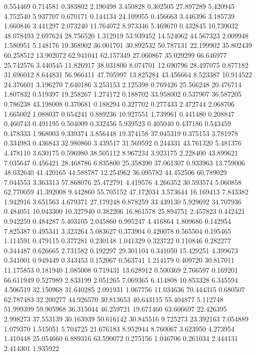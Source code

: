 0.554469
0.714581
0.383802
2.190498
3.450828
0.302505
27.897289
5.420945
4.752540
5.937707
0.670171
0.144134
24.109955
0.456663
3.446396
3.185739
1.660846
3.441297
2.073240
11.764072
8.973346
5.469670
0.432845
10.739032
48.078493
2.697624
28.756520
1.312919
53.939452
14.524062
44.567323
2.009948
1.580951
5.148176
19.368902
36.001701
30.892532
50.787131
22.199902
35.802439
60.258512
13.902072
62.941041
62.157349
27.060867
35.029299
66.646977
25.742576
3.440545
11.826917
38.031800
8.074701
12.690796
28.497075
0.877182
31.696012
8.644831
56.966411
47.705997
13.825284
43.456664
8.523387
10.914522
24.376601
3.196270
7.640186
3.253153
2.125398
0.769426
25.566248
20.476714
1.807832
0.519397
19.258267
1.274172
0.188702
33.958002
0.537907
36.587205
0.786238
43.198008
0.370681
0.188294
0.327702
0.277433
2.472744
2.068706
1.665002
1.088037
0.654241
0.889236
10.927551
1.739961
0.441480
0.208847
0.460743
0.491195
0.504009
0.332456
5.939523
0.405040
0.437186
0.543459
0.478333
1.968003
9.339374
3.856448
19.374158
37.045319
0.375153
3.781978
0.334983
0.436843
32.980860
3.439517
31.569592
0.244331
43.761320
5.481376
4.478110
3.630175
0.596980
38.505112
8.967234
3.923175
2.228400
43.899621
7.035647
0.456421
28.468786
6.835800
25.358390
37.061307
0.933963
13.759006
48.032640
41.420165
44.588787
12.254962
36.095782
44.452506
60.789029
7.044553
3.363313
57.868076
25.472791
4.419576
4.266352
30.593574
5.060858
62.770059
41.392008
9.442860
55.705152
47.172034
3.573644
16.169413
7.843382
1.942916
3.651563
4.679371
27.179248
0.878259
33.439130
5.929692
34.707936
0.484051
10.043300
10.327940
0.382206
16.861578
25.894751
2.457823
0.442421
0.942259
0.484287
5.403105
2.045860
0.995247
4.416864
1.809686
0.142954
7.825387
0.495341
3.323264
5.083627
0.373904
0.420078
0.565504
0.195465
1.114591
0.479115
0.377281
0.230148
1.041329
0.323722
0.110846
0.282277
0.344487
0.626665
2.731582
0.192297
29.301104
0.341050
15.429251
4.399673
0.341001
0.949449
0.343453
0.152067
0.563741
1.214179
0.409720
30.817011
11.175853
0.181940
1.085008
0.719431
13.628912
0.500369
2.766597
0.169201
66.611949
0.527989
2.833199
2.051265
7.069365
6.414808
10.853328
6.345594
4.506519
32.150968
31.640285
2.091931
1.067756
11.034636
70.444315
0.680507
62.787483
32.200277
44.926570
30.813653
40.643115
55.404877
5.112748
51.999399
59.905968
36.315044
46.259721
19.671460
63.606697
22.426395
2.998273
37.553139
30.163939
50.616142
30.845516
9.725273
23.392163
7.054889
1.079370
1.515051
5.704725
21.676183
8.952944
8.760067
3.623950
4.273954
1.410448
25.054660
6.889316
63.590072
0.275156
1.046706
0.261034
2.444131
2.414301
1.935922
